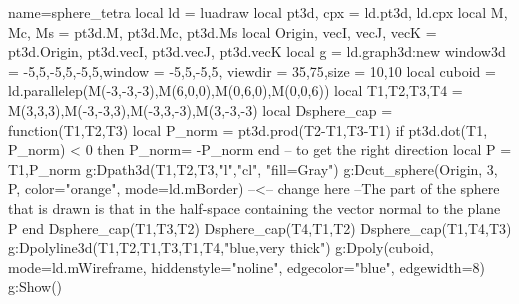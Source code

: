 \begin{luadraw}{name=sphere_tetra}
local ld = luadraw
local pt3d, cpx = ld.pt3d, ld.cpx
local M, Mc, Ms = pt3d.M, pt3d.Mc, pt3d.Ms
local Origin, vecI, vecJ, vecK = pt3d.Origin, pt3d.vecI, pt3d.vecJ, pt3d.vecK
local g = ld.graph3d:new{
    window3d = {-5,5,-5,5,-5,5},window = {-5,5,-5,5},
    viewdir = {35,75},size = {10,10}
}
local cuboid = ld.parallelep(M(-3,-3,-3),M(6,0,0),M(0,6,0),M(0,0,6))
local T1,T2,T3,T4 = M(3,3,3),M(-3,-3,3),M(-3,3,-3),M(3,-3,-3)
local Dsphere_cap = function(T1,T2,T3)
    local P_norm = pt3d.prod(T2-T1,T3-T1)
    if pt3d.dot(T1, P_norm) < 0 then P_norm= -P_norm end -- to get the right direction
    local P = {T1,P_norm}
    g:Dpath3d({T1,T2,T3,"l","cl"}, "fill=Gray")
    g:Dcut_sphere(Origin, 3, P, {color="orange", mode=ld.mBorder}) --<-- change here
    --The part of the sphere that is drawn is that in the half-space containing the vector normal to the plane P
end
Dsphere_cap(T1,T3,T2)
Dsphere_cap(T4,T1,T2)
Dsphere_cap(T1,T4,T3)
g:Dpolyline3d({{T1,T2},{T1,T3},{T1,T4}},"blue,very thick")
g:Dpoly(cuboid, {mode=ld.mWireframe, hiddenstyle="noline", edgecolor="blue", edgewidth=8})
g:Show()
\end{luadraw}
